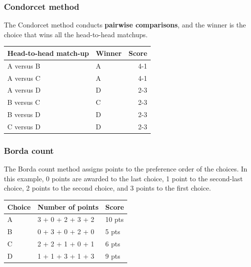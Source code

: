 \documentclass[11pt]{article}
\begin{document}
\subsubsection{Condorcet method}
\label{sec:org4cb7300}
The Condorcet method conducts \textbf{pairwise comparisons}, and the winner is the choice that wins all the head-to-head matchups.
\begin{center}
\begin{tabular}{l|l|r}
Head-to-head match-up & Winner & Score\\
\hline
A versus B & A & 4-1\\
A versus C & A & 4-1\\
A versus D & D & 2-3\\
B versus C & C & 2-3\\
B versus D & D & 2-3\\
C versus D & D & 2-3\\
\end{tabular}
\end{center}
\subsubsection{Borda count}
\label{sec:orgd374376}
The Borda count method assigns points to the preference order of the choices. In this example, 0 points are awarded to the last choice, 1 point to the second-last choice, 2 points to the second choice, and 3 points to the first choice.
\begin{center}
\begin{tabular}{l|l|l}
Choice & Number of points & Score\\
\hline
A & 3 + 0 + 2 + 3 + 2 & 10 pts\\
B & 0 + 3 + 0 + 2 + 0 & 5 pts\\
C & 2 + 2 + 1 + 0 + 1 & 6 pts\\
D & 1 + 1 + 3 + 1 + 3 & 9 pts\\
\end{tabular}
\end{center}

 \newpage
\end{document}
